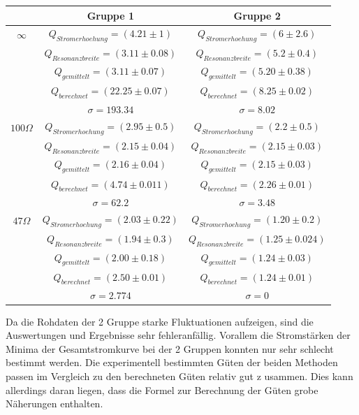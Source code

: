 \documentclass[a4paper, 11pt]{article}
\begin{document}
\begin{tabular}{|c|c|c|}
\hline $ $ & Gruppe 1 & Gruppe 2 \\
\hline $\infty$ &  $ Q_{Stromerhoehung} = (4.21 \pm 1) $  & $ Q_{Stromerhoehung} = (6 \pm 2.6) $    \\
 $ $ & $ Q_{Resonanzbreite} = (3.11 \pm 0.08) $  & $ Q_{Resonanzbreite} = (5.2 \pm 0.4) $  \\
 $ $ & $ Q_{gemittelt} = (3.11 \pm 0.07) $  &  $Q_{gemittelt} = (5.20 \pm 0.38) $ \\
 $ $ & $ Q_{berechnet} = (22.25 \pm 0.07) $  & $ Q_{berechnet} = (8.25 \pm 0.02) $  \\ 
 $ $ &  $ \sigma = 193.34 $ & $ \sigma = 8.02$  \\
\hline $100\Omega$ & $ Q_{Stromerhoehung} = (2.95 \pm 0.5) $   &  $ Q_{Stromerhoehung} = (2.2 \pm 0.5) $   \\
 $ $ &  $ Q_{Resonanzbreite} = (2.15 \pm 0.04) $ &   $ Q_{Resonanzbreite} = (2.15 \pm 0.03) $ \\
 $ $ &  $ Q_{gemittelt} = (2.16 \pm 0.04) $ &  $Q_{gemittelt} = (2.15 \pm 0.03)$  \\
  $ $ &  $ Q_{berechnet} = (4.74 \pm 0.011) $ &  $ Q_{berechnet} = (2.26 \pm 0.01) $  \\
 
 $ $ &  $\sigma = 62.2 $& $\sigma =3.48$ \\
\hline $47\Omega$ & $ Q_{Stromerhoehung} = (2.03 \pm 0.22) $   &  $ Q_{Stromerhoehung} = (1.20 \pm 0.2) $   \\
 $ $ &  $ Q_{Resonanzbreite} = (1.94 \pm 0.3) $ &   $ Q_{Resonanzbreite} = (1.25 \pm 0.024) $ \\
 $ $ &  $ Q_{gemittelt} = (2.00 \pm 0.18) $ &  $Q_{gemittelt} = (1.24 \pm 0.03) $  \\
  $ $ &  $ Q_{berechnet} = (2.50 \pm 0.01) $ &  $ Q_{berechnet} = (1.24 \pm 0.01) $  \\

 $ $ &  $\sigma = 2.774 $& $\sigma =0$ \\
\hline
\end{tabular}
 \newline
Da die Rohdaten der 2 Gruppe starke Fluktuationen aufzeigen, sind die Auswertungen und Ergebnisse sehr fehleranfällig. Vorallem die Stromstärken der Minima der Gesamtstromkurve bei der 2 Gruppen konnten nur sehr schlecht bestimmt werden.
Die experimentell bestimmten Güten der beiden Methoden passen im Vergleich zu den berechneten Güten relativ gut z  usammen. Dies kann allerdings daran liegen, dass die Formel zur Berechnung der Güten grobe Näherungen enthalten.
\end{document}
